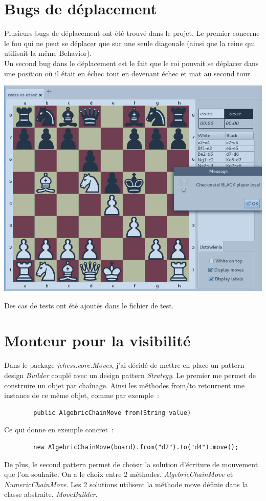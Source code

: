 \documentclass{article}
\begin{document}
	\section{Bugs de déplacement}
	\label{sec:Bugs de deplacement}
	Plusieurs bugs de déplacement ont été trouvé dans le projet. Le premier concerne le fou qui ne peut se déplacer que sur une seule diagonale (ainsi que la reine qui utilisait la même Behavior).\\
	Un second bug dans le déplacement est le fait que le roi pouvait se déplacer dans une position où il était en échec tout en devenant échec et mat au second tour.
	\begin{center}
		\includegraphics[scale=0.5]{img/Badmat}
		\label{Badmat}
	\end{center}
	Des cas de tests ont été ajoutés dans le fichier de test.

	\section{Monteur pour la visibilité}
	\label{sec:Monteur pour la visibilite}
	Dans le package \emph{jchess.core.Moves}, j'ai décidé de mettre en place un pattern design \emph{Builder} couplé avec un design pattern \emph{Strategy}. Le premier me permet de construire un objet par chaînage. Ainsi les méthodes from/to retournent une instance de ce même objet, comme par exemple~:
	\begin{verbatim}
		public AlgebricChainMove from(String value)
	\end{verbatim}
	Ce qui donne en exemple concret~:
	\begin{verbatim}
		new AlgebricChainMove(board).from("d2").to("d4").move();
	\end{verbatim}
	De plus, le second pattern permet de choisir la solution d'écriture de mouvement que l'on souhaite. On a le choix entre 2 méthodes. \emph{AlgebricChainMove} et \emph{NumericChainMove}. Les 2 solutions utilisent la méthode move définie dans la classe abstraite. \emph{MoveBuilder}.
\end{document}
